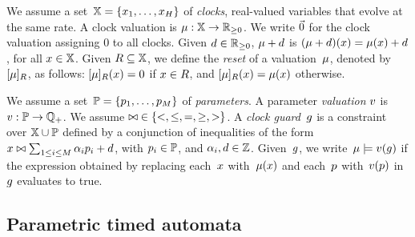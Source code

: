 \begin{tikzborder}{\cite{Gargantini16:validation}}
\begin{tikzborder}{\cite{gargantini_combinatorial_2017}}
\begin{tikzborder}{\cite{garn2019}}
\begin{tikzborder}{\cite{arcaini2019achieving}}
\begin{tikzborder}{\cite{arcaini2019varivolution}}
\begin{tikzborder}{\cite{andre_tap_2019}}
We assume a set~$\mathbb{X} = \{ x_1, \dots, x_H \} $ of \emph{clocks}, \ie{} real-valued variables that evolve at the same rate.
A clock valuation is 
$\mu : \mathbb{X} \rightarrow {\mathbb{R}}_{\geq 0}$.
We write $\vec{0}$ for the clock valuation assigning $0$ to all clocks.
Given $d \in {\mathbb{R}}_{\geq 0}$, $\mu + d$ is \st{} $(\mu + d)(x) = \mu(x) + d$, for all $x \in \mathbb{X}$.
%
Given $R \subseteq \mathbb{X}$, we define the \emph{reset} of a valuation~$\mu$, denoted by $[\mu]_{R}$, as follows: $[\mu]_{R}(x) = 0$ if $x \in R$, and $[\mu]_{R}(x)=\mu(x)$ otherwise.

We assume a set~$\mathbb{P} = \{ p_1, \dots, p_M \} $ of \emph{parameters}.
A parameter {\em valuation} $v$ is
$v : \mathbb{P} \rightarrow {\mathbb Q}_{+}$.
We assume ${\bowtie} \in \{<, \leq, =, \geq, >\}$.
A \emph{clock guard}~$g$ is a constraint over $\mathbb{X} \cup \mathbb{P}$ defined by a conjunction of inequalities of the form
$x \bowtie \sum_{1 \leq i \leq M} \alpha_i p_i + d$, with
$p_i \in \mathbb{P}$,
and
$\alpha_i, d \in {\mathbb Z}$.
%
Given~$g$, we write~$\mu\models v(g)$ if %
the expression obtained by replacing each~$x$ with~$\mu(x)$ and each~$p$ with~$v(p)$ in~$g$ evaluates to true.
\end{tikzborder}

\subsection{Parametric timed automata}


\end{tikzborder}
\end{tikzborder}
\end{tikzborder}
\end{tikzborder}
\end{tikzborder}
